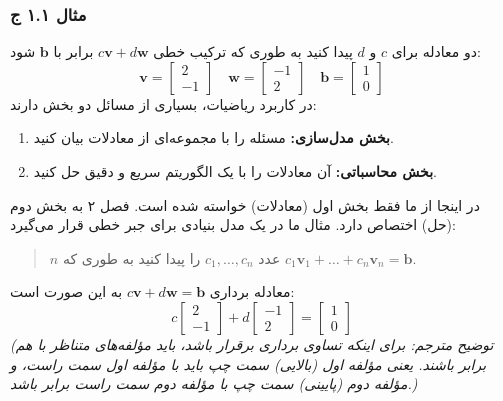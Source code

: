 \documentclass[12pt, a4paper]{book}
\begin{document}
	\subsubsection*{مثال ۱.۱ ج}
	دو معادله برای $c$ و $d$ پیدا کنید به طوری که ترکیب خطی $c\mathbf{v} + d\mathbf{w}$ برابر با $\mathbf{b}$ شود:
	\[ \mathbf{v} = \begin{bmatrix} 2 \\ -1 \end{bmatrix} \quad \mathbf{w} = \begin{bmatrix} -1 \\ 2 \end{bmatrix} \quad \mathbf{b} = \begin{bmatrix} 1 \\ 0 \end{bmatrix} \]
	در کاربرد ریاضیات، بسیاری از مسائل دو بخش دارند:
	\begin{enumerate}
		\item \textbf{بخش مدل‌سازی:} مسئله را با مجموعه‌ای از معادلات بیان کنید.
		\item \textbf{بخش محاسباتی:} آن معادلات را با یک الگوریتم سریع و دقیق حل کنید.
	\end{enumerate}
	در اینجا از ما فقط بخش اول (معادلات) خواسته شده است. فصل ۲ به بخش دوم (حل) اختصاص دارد. مثال ما در یک مدل بنیادی برای جبر خطی قرار می‌گیرد:
	\begin{quote}
		$n$ عدد $c_1, \dots, c_n$ را پیدا کنید به طوری که $c_1\mathbf{v}_1 + \dots + c_n\mathbf{v}_n = \mathbf{b}$.
	\end{quote}
	معادله برداری $c\mathbf{v} + d\mathbf{w} = \mathbf{b}$ به این صورت است:
	\[ c\begin{bmatrix} 2 \\ -1 \end{bmatrix} + d\begin{bmatrix} -1 \\ 2 \end{bmatrix} = \begin{bmatrix} 1 \\ 0 \end{bmatrix} \]
	\textit{(توضیح مترجم: برای اینکه تساوی برداری برقرار باشد، باید مؤلفه‌های متناظر با هم برابر باشند. یعنی مؤلفه اول (بالایی) سمت چپ باید با مؤلفه اول سمت راست، و مؤلفه دوم (پایینی) سمت چپ با مؤلفه دوم سمت راست برابر باشد.)}
	
\end{document}
